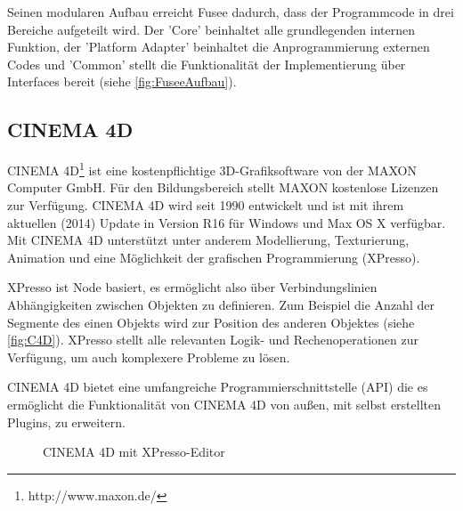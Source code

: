 Seinen modularen Aufbau erreicht Fusee dadurch, dass der Programmcode in drei Bereiche aufgeteilt wird. Der 'Core' beinhaltet alle grundlegenden internen Funktion, der 'Platform Adapter' beinhaltet die Anprogrammierung externen Codes und 'Common' stellt die Funktionalität der Implementierung über Interfaces bereit (siehe \autoref{fig:FuseeAufbau}).

\subsection{CINEMA 4D}
\label{sec:c4d}

CINEMA 4D\footnote{http://www.maxon.de/} ist eine kostenpflichtige 3D-Grafiksoftware von der MAXON Computer GmbH. Für den Bildungsbereich stellt MAXON kostenlose Lizenzen zur Verfügung. CINEMA 4D wird seit 1990 entwickelt und ist mit ihrem aktuellen (2014) Update in Version R16 für Windows und Max OS X verfügbar. Mit CINEMA 4D unterstützt unter anderem Modellierung, Texturierung, Animation und eine Möglichkeit der grafischen Programmierung (XPresso).

XPresso ist Node basiert, es ermöglicht also über Verbindungslinien Abhängigkeiten zwischen Objekten zu definieren. Zum Beispiel die Anzahl der Segmente des einen Objekts wird zur Position des anderen Objektes (siehe \autoref{fig:C4D}). XPresso stellt alle relevanten Logik- und Rechenoperationen zur Verfügung, um auch komplexere Probleme zu lösen.

CINEMA 4D bietet eine umfangreiche Programmierschnittstelle (API) die es ermöglicht die Funktionalität von CINEMA 4D von außen, mit selbst erstellten Plugins, zu erweitern. 

\begin{figure}[htbp]
  \centering
  \caption{CINEMA 4D mit XPresso-Editor}
  \label{fig:C4D}
\end{figure}

